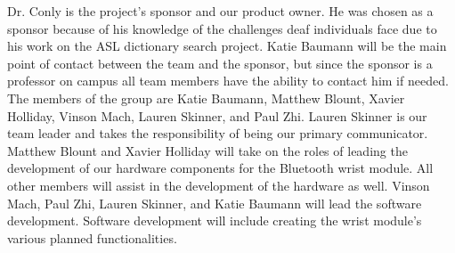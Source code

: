 Dr. Conly is the project's sponsor and our product owner. He was chosen as a sponsor because of his knowledge of the challenges deaf individuals face due to his work on the ASL dictionary search project. Katie Baumann will be the main point of contact between the team and the sponsor, but since the sponsor is a professor on campus all team members have the ability to contact him if needed. The members of the group are Katie Baumann, Matthew Blount, Xavier Holliday, Vinson Mach, Lauren Skinner, and Paul Zhi. Lauren Skinner is our team leader and takes the responsibility of being our primary communicator. Matthew Blount and Xavier Holliday will take on the roles of leading the development of our hardware components for the Bluetooth wrist module. All other members will assist in the development of the hardware as well. Vinson Mach, Paul Zhi, Lauren Skinner, and Katie Baumann will lead the software development. Software development will include creating the wrist module's various planned functionalities.  